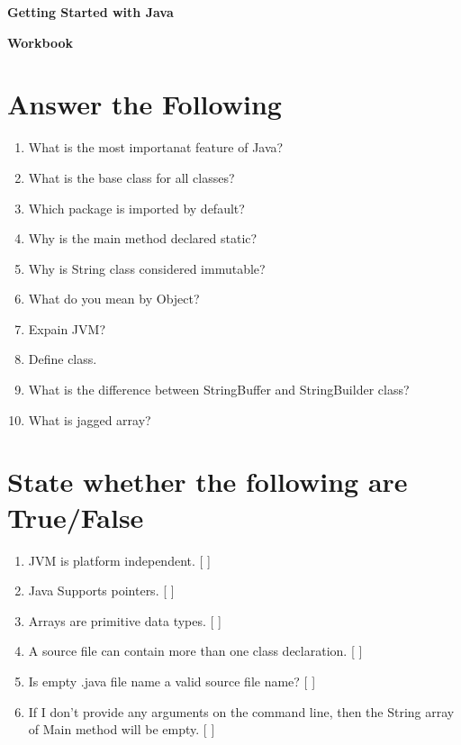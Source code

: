 \documentclass[11pt,a4paper]{article}
\def\AnswerBox{\fbox{\begin{minipage}{4in}\hfill\vspace{0.5in}\end{minipage}}}
\begin{document}
\centerline{\huge{ \textbf{ Getting Started with Java}}}

\vspace{1pc}

\centerline{\huge{ \textbf{ Workbook}}}

\section*{Answer the Following}
\begin{enumerate}\itemsep10pt

\item What is the most importanat feature of Java? \underline{\hspace{4cm}}
\item What is the base class for all classes? \underline{\hspace{4cm}}
\item Which package is imported by default?  \underline{\hspace{4cm}}
\item Why is the main method declared static?  \underline{\hspace{4cm}}
\item Why is String class considered immutable? 

    \AnswerBox

\item What do you mean by Object?
    
    \AnswerBox

\item Expain JVM?
    
    \AnswerBox

\item Define class.
    
    \AnswerBox

\item What is the difference between StringBuffer and StringBuilder class?
    
    \AnswerBox

\item What is jagged array?
    
    \AnswerBox

\end{enumerate}
\section*{State whether the following are True/False}
\begin{enumerate}\itemsep2pt
        \item JVM is platform independent. [         ]
        \item Java Supports pointers. [ ]
        \item Arrays are primitive data types. [    ]
        \item A source file can contain more than one class declaration. [    ]
        \item Is empty .java file name a valid source file name? [    ]
        \item If I don't provide any arguments on the command line, then the String array of Main method will be empty. [   ]
        
\end{enumerate}
\end{document}
